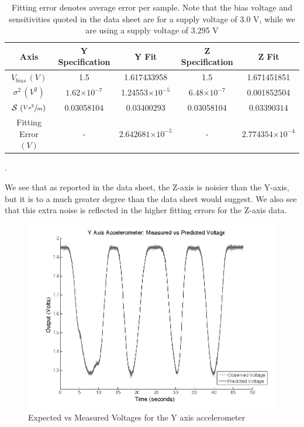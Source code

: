 \documentclass{article}
\theoremstyle{plain}
\theoremstyle{definition}
\theoremstyle{remark}
\newcommand{\Sens}{\mathcal{S}}
\providecommand{\e}[1]{\ensuremath{\times 10^{#1}}}
\begin{document}
\begin{table}
\begin{center}
    \begin{tabular}{|c|c|c|c|c|}
        \hline
        Axis                              & Y Specification & Y   Fit & Z Specification                & Z    Fit                \\ \hline
        $V_{bias} \, (V)$                & 1.5        & 1.617433958  & 1.5         & 1.671451851           \\ 
        $\sigma^2 \, (V^2)$                  & $1.62 \e{-7}$      & 1.24553\e{-5}    & $6.48 \e{-7}$       & 0.001852504           \\ 
        $\Sens \, \left(\sfrac{V s^2}{m} \right)$                & 0.03058104           & $0.03400293$  & 0.03058104   & $0.03390314$     \\ 
        Fitting Error $(V)$  & - & $2.642681\e{-5}$  & - & $2.774354\e{-4}$ \\
        \hline
    \end{tabular}
\caption{Fitting error denotes average error per sample.  Note that the bias voltage and sensitivities quoted in the data sheet are for a supply voltage of 3.0 V, while we are using a supply voltage of 3.295 V}.
\label{ParamID_T}
\end{center}
\end{table}

We see that as reported in the data sheet, the Z-axis is noisier than the Y-axis, but it is to a much greater degree than the data sheet would suggest.  We also see that this extra noise is reflected in the higher fitting errors for the Z-axis data.  

\begin{figure}
\begin{center}
\includegraphics[width = 13cm]{YaxisAccel_Calib.png}
\caption{Expected vs Measured Voltages for the Y axis accelerometer}
\label{YaccelCalib}
\end{center}
\end{figure}
\end{document}
